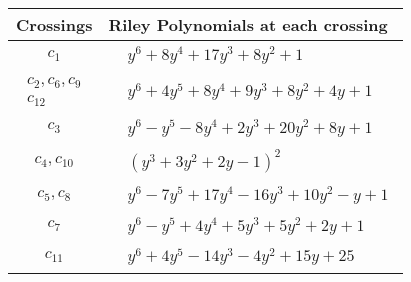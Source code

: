\documentclass[1p]{elsarticle_modified}
\theoremstyle{definition}
\begin{document}
\begin{tabular}{m{50pt}|m{274pt}}
Crossings & \hspace{64pt}Riley Polynomials at each crossing \\
\hline $$\begin{aligned}c_{1}\end{aligned}$$&$\begin{aligned}
&y^6+8 y^4+17 y^3+8 y^2+1
\end{aligned}$\\
\hline $$\begin{aligned}c_{2},c_{6},c_{9}\\c_{12}\end{aligned}$$&$\begin{aligned}
&y^6+4 y^5+8 y^4+9 y^3+8 y^2+4 y+1
\end{aligned}$\\
\hline $$\begin{aligned}c_{3}\end{aligned}$$&$\begin{aligned}
&y^6- y^5-8 y^4+2 y^3+20 y^2+8 y+1
\end{aligned}$\\
\hline $$\begin{aligned}c_{4},c_{10}\end{aligned}$$&$\begin{aligned}
&(y^3+3 y^2+2 y-1)^2
\end{aligned}$\\
\hline $$\begin{aligned}c_{5},c_{8}\end{aligned}$$&$\begin{aligned}
&y^6-7 y^5+17 y^4-16 y^3+10 y^2- y+1
\end{aligned}$\\
\hline $$\begin{aligned}c_{7}\end{aligned}$$&$\begin{aligned}
&y^6- y^5+4 y^4+5 y^3+5 y^2+2 y+1
\end{aligned}$\\
\hline $$\begin{aligned}c_{11}\end{aligned}$$&$\begin{aligned}
&y^6+4 y^5-14 y^3-4 y^2+15 y+25
\end{aligned}$\\
\hline
\end{tabular}\\~\\
\end{document}
